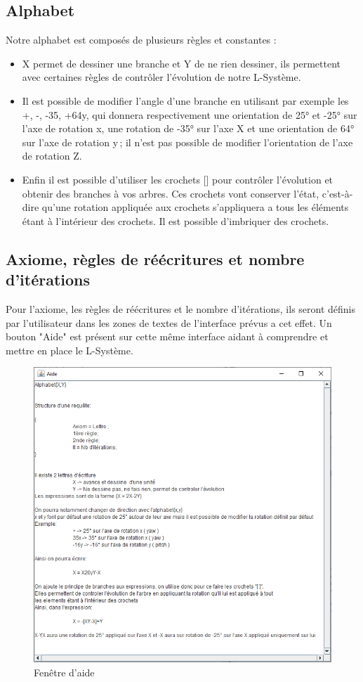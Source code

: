 \subsection{Alphabet}
\label{sec:Alphabet}
Notre alphabet est composés de plusieurs règles et constantes :\\
\begin{itemize}
    \item X permet de dessiner une branche et Y de ne rien dessiner, ils permettent avec certaines règles de contrôler l'évolution de notre L-Système.
    \item Il est possible de modifier l'angle d'une branche en utilisant par exemple les +, -, -35, +64y, qui donnera respectivement une orientation de 25° et -25° sur l'axe de rotation x, une rotation de -35° sur l'axe X et une orientation de 64° sur l'axe de rotation y ; il n'est pas possible de modifier l'orientation de l'axe de rotation Z.
\item Enfin il est possible d'utiliser les crochets [] pour contrôler l'évolution et obtenir des branches à vos arbres. Ces crochets vont conserver l'état, c’est-à-dire qu'une rotation appliquée aux crochets s'appliquera a tous les éléments étant à l'intérieur des crochets. Il est possible d'imbriquer des crochets.\\
\end{itemize}

\subsection{Axiome, règles de réécritures et nombre d'itérations}
Pour l'axiome, les règles de réécritures et le nombre d'itérations, ils seront définis par l'utilisateur dans les zones de textes de l'interface prévus a cet effet. 
Un bouton "Aide" est présent sur cette même interface aidant à comprendre et mettre en place le L-Système.

\begin{figure}[h!]
    \centering
    \includegraphics[width=0.8\linewidth]{pics/aideGUI.png}
    \caption{Fenêtre d'aide}
    \label{fig:help_frame}
\end{figure}
